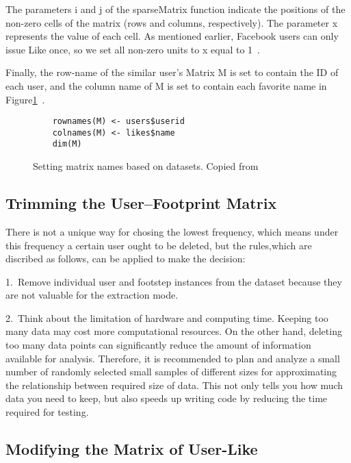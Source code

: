 The parameters i and j of the sparseMatrix function indicate the 
positions of the non-zero cells of the matrix (rows and columns, 
respectively). The parameter x represents the value of each cell. 
As mentioned earlier, Facebook users can only issue Like once, so 
we set all non-zero units to x equal to 1~\cite{hid515-12}.

Finally, the row-name of the similar user's Matrix M is set to 
contain the ID of each user, and the column name of M is set to 
contain each favorite name in 
Figure\ref{F:setting names}~\cite{hid515-12}.

\begin{figure}[htb]
\begin{footnotesize}
\begin{verbatim}
    rownames(M) <- users$userid
    colnames(M) <- likes$name
    dim(M)
\end{verbatim}
\end{footnotesize}
\caption{Setting matrix names based on datasets. 
Copied from~\cite{hid515-12}}
\label{F:setting names}
\end{figure}


\subsection{Trimming the User–Footprint Matrix~\cite{hid515-12}}

There is not a unique way for chosing the lowest 
frequency, which means under this frequency a certain user ought to be 
deleted, but the rules,which are discribed as follows, 
can be applied to make the decision:

1.\ Remove individual user and footstep instances from the 
dataset because they are not valuable for the extraction mode. 

2.\ Think about the limitation of hardware and computing time. 
Keeping too many data may cost more computational resources. 
On the
 other hand, deleting too many data points can significantly reduce
 the amount of information available for analysis. Therefore, it is
 recommended to plan and analyze a small number of randomly 
selected small samples of different sizes for approximating 
the relationship between required size of data. 
This not only tells you how much data you need to keep, 
but also speeds up writing code by reducing the time required for 
testing.

\subsection{Modifying the Matrix of User-Like~\cite{hid515-12}}

